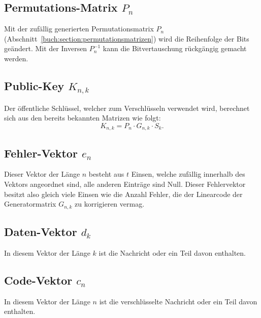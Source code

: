 \subsection{Permutations-Matrix $P_n$
\label{mceliece:subsection:p_n}}
Mit der zufällig generierten Permutationsmatrix $P_n$ (Abschnitt~\ref{buch:section:permutationsmatrizen}) wird die Reihenfolge der Bits geändert.
Mit der Inversen $P_n^{-1}$ kann die Bitvertauschung rückgängig gemacht werden.

\subsection{Public-Key $K_{n,k}$
\label{mceliece:subsection:k_nk}}
Der öffentliche Schlüssel, welcher zum Verschlüsseln verwendet wird,
berechnet sich aus den bereits bekannten Matrizen wie folgt:
\[
    K_{n,k}=P_{n}\cdot G_{n,k}\cdot S_{k}.
\]

\subsection{Fehler-Vektor $e_n$
\label{mceliece:subsection:e_n}}
Dieser Vektor der Länge $n$ besteht aus $t$ Einsen, welche zufällig innerhalb des Vektors angeordnet sind,
alle anderen Einträge sind Null.
Dieser Fehlervektor besitzt also gleich viele Einsen
wie die Anzahl Fehler, die der Linearcode der Generatormatrix $G_{n,k}$ zu korrigieren vermag.

\subsection{Daten-Vektor $d_k$
\label{mceliece:subsection:d_k}}
In diesem Vektor der Länge $k$ ist die Nachricht oder ein Teil davon enthalten.

\subsection{Code-Vektor $c_n$
\label{mceliece:subsection:c_n}}
In diesem Vektor der Länge $n$ ist die verschlüsselte Nachricht oder ein Teil davon enthalten.

